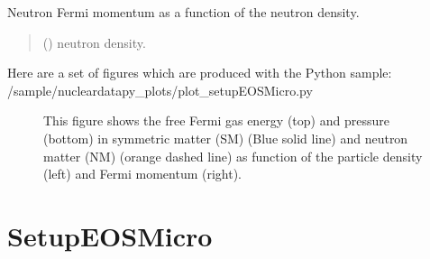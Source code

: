\documentclass[letterpaper,10pt,english]{sphinxmanual}
\begin{document}

\begin{fulllineitems}
\label{\detokenize{source/api/setup_eos_ffg:nucleardatapy.setup_eos_ffg.kf_n}}
\pysigstartsignatures
\pysiglinewithargsret
{}
{}
{}
\pysigstopsignatures
\sphinxAtStartPar
Neutron Fermi momentum as a function of the neutron density.
\begin{quote}\begin{description}
\sphinxAtStartPar
{} () \textendash{} neutron density.

\end{description}\end{quote}

\end{fulllineitems}


\sphinxAtStartPar
Here are a set of figures which are produced with the Python sample: /sample/nucleardatapy\_plots/plot\_setupEOSMicro.py

\begin{figure}[htbp]
\centering
\capstart

\noindent{}
\caption{This figure shows the free Fermi gas energy (top) and pressure (bottom) in symmetric matter (SM) (Blue solid line) and neutron matter (NM) (orange dashed line) as function of the particle density (left) and Fermi momentum (right).}\label{\detokenize{source/api/setup_eos_ffg:id1}}\end{figure}

\sphinxstepscope


\section{SetupEOSMicro}
\label{\detokenize{source/api/setup_eos_micro:setupeosmicro}}\label{\detokenize{source/api/setup_eos_micro::doc}}\label{\detokenize{source/api/setup_eos_micro:module-nucleardatapy.setup_eos_micro}}
\end{document}
